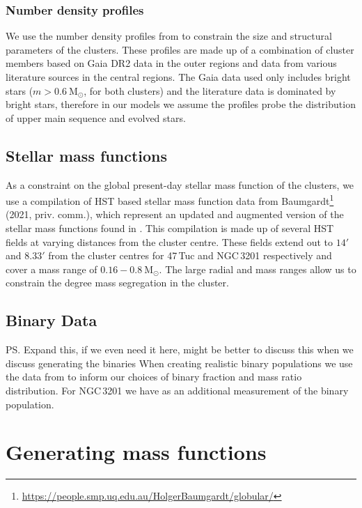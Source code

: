 \subsubsection{Number density profiles}
We use the number density profiles from \citet{DeBoer2019} to constrain the size and structural
parameters of the clusters. These profiles are made up of a combination of cluster members based on
Gaia DR2 data in the outer regions and data from various literature sources in the central regions.
The Gaia data used only includes bright stars ($m > 0.6 \ \mathrm{M}_\odot$, for both clusters) and
the literature data is dominated by bright stars, therefore in our models we assume the profiles
probe the distribution of upper main sequence and evolved stars.

\subsection{Stellar mass functions}

As a constraint on the global present-day stellar mass function of the clusters, we use a
compilation of HST based stellar mass function data from
Baumgardt\footnote{\url{https://people.smp.uq.edu.au/HolgerBaumgardt/globular/}} (2021, priv.
comm.), which represent an updated and augmented version of the stellar mass functions found in
\citet{Sollima2017}. This compilation is made up of several HST fields at varying distances from the
cluster centre. These fields extend out to $14 '$ and $8.33 '$ from the cluster centres for 47\,Tuc
and NGC\,3201 respectively and cover a mass range of $0.16 - 0.8 \ \mathrm{M}_\odot$. The large
radial and mass ranges allow us to constrain the degree mass segregation in the cluster.


\subsection{Binary Data}

\ps{Expand this, if we even need it here, might be better to discuss this when we discuss generating
	the binaries} When creating realistic binary populations we use the data from \citet{Milone2012} to
inform our choices of binary fraction and mass ratio distribution. For NGC\,3201 we have
\citet{Giesers2019} as an additional measurement of the binary population.





\section{Generating mass functions}

